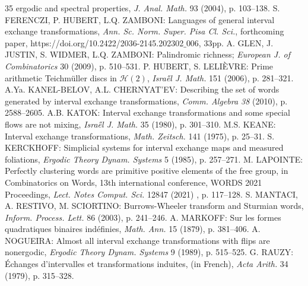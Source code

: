 \documentclass[12pt,a4paper]{amsart}
\begin{document}
\begin{thebibliography}{35}
 ergodic and spectral properties,
 {\it J. Anal. Math.} 93 (2004), p. 103--138.
 S. FERENCZI, P. HUBERT, L.Q. ZAMBONI:
Languages of  general interval exchange transformations,  
{\it Ann. Sc.  Norm. Super. Pisa Cl. Sci.}, forthcoming paper, https://doi.org/10.2422/2036-2145.202302$\_$006, 33pp.
 A. GLEN, J. JUSTIN, S. WIDMER, L.Q. ZAMBONI:  Palindromic richness; {\it European J. of Combinatorics} 30 (2009), p. 510--531. 
 P. HUBERT, S. LELI\` EVRE: Prime arithmetic Teichmüller discs in $\mathscr H(2)$, 
{\it  Isra\H el J. Math.} 151 (2006), p. 281--321.
 A.Ya. KANEL-BELOV, A.L. CHERNYAT'EV:
Describing the set of words generated by interval exchange transformations,
{\it Comm. Algebra 38} (2010), p. 2588--2605.
 A.B. KATOK:  Interval exchange transformations and some special flows 
are not mixing, {\it Isra\H el J. Math.} 35 (1980), p. 301--310.
  M.S. KEANE: Interval exchange
 transformations, {\it Math. Zeitsch.} 141 (1975), p.
25--31.
 S. KERCKHOFF:  Simplicial systems for interval exchange
maps and
measured foliations, {\it Ergodic Theory Dynam. Systems} 5 (1985), p. 257--271.
 M. LAPOINTE:  Perfectly clustering words are primitive positive elements of the free group, in
Combinatorics on Words, 13th international conference, WORDS 2021 Proceedings, {\it Lect. Notes Comput. Sci.} 12847 (2021) , p. 117--128.
 S. MANTACI, A. RESTIVO, M. SCIORTINO:  Burrows-Wheeler transform and Sturmian words, {\it Inform. Process. Lett.} 86 (2003), p. 241--246. 
 A.  MARKOFF: Sur les formes quadratiques binaires indéfinies, {\it Math. Ann.} 15 (1879),
p. 381–406.
 A. NOGUEIRA: Almost all interval exchange transformations with flips are nonergodic, {\it Ergodic Theory Dynam. Systems} 9 (1989), p. 515--525.
  G. RAUZY: \'Echanges d'intervalles et
transformations induites, (in French), {\it Acta Arith.} 34 (1979),
p. 315--328.
\end{thebibliography}
\end{document}
